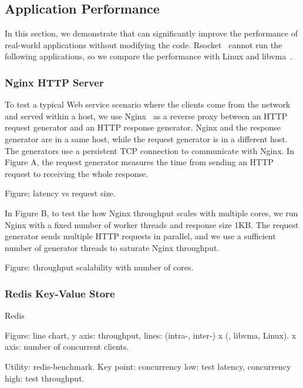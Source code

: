 \subsection{Application Performance}
\label{subsec:application}

In this section, we demonstrate that \sys{} can significantly improve the performance of real-world applications without modifying the code.
Rsocket~\cite{rsockets} cannot run the following applications, so we compare the performance with Linux and libvma~\cite{libvma}.

\subsubsection{Nginx HTTP Server}
\quad

To test a typical Web service scenario where the clients come from the network and served within a host, we use Nginx~\cite{nginx} as a reverse proxy between an HTTP request generator and an HTTP response generator.
Nginx and the response generator are in a same host, while the request generator is in a different host.
The generators use a persistent TCP connection to communicate with Nginx.
In Figure A, the request generator measures the time from sending an HTTP request to receiving the whole response.

Figure: latency vs request size.

In Figure B, to test the how Nginx throughput scales with multiple cores, we run Nginx with a fixed number of worker threads and response size 1KB.
The request generator sends multiple HTTP requests in parallel, and we use a sufficient number of generator threads to saturate Nginx throughput.

Figure: throughput scalability with number of cores.

\subsubsection{Redis Key-Value Store}
\quad

Redis~\cite{redis}

Figure: line chart, y axis: throughput, lines: (intra-, inter-) x (\sys{}, libvma, Linux). x axis: number of concurrent clients.

Utility: redis-benchmark.
Key point: concurrency low: test latency, concurrency high: test throughput.


